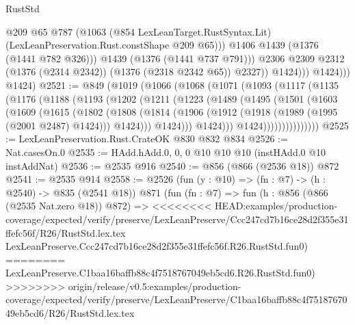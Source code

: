 \begin{lexlean}{RustStd}
\begin{coremodule}
{\begin{coremodule}
{{{{{                            @209
                            @65
                            @787
                            (@1063
                              (@854 LexLeanTarget.RustSyntax.Lit)
                              (LexLeanPreservation.Rust.constShape @209 @65)))
                          @1406
                          @1439
                          (@1376 (@1441 @782 @326)))
                        @1439
                        (@1376 (@1441 @737 @791)))
                      @2306
                      @2309
                      @2312
                      (@1376 (@2314 @2342))
                      (@1376 (@2318 @2342 @65))
                      @2327))
                  @1424)))
            @1424)))
      @1424)
@2521 := @849
    (@1019
      (@1066
        (@1068
          (@1071
            (@1093
              (@1117
                (@1135
                  (@1176
                    (@1188
                      (@1193
                        (@1202
                          (@1211
                            (@1223
                              (@1489
                                (@1495
                                  (@1501
                                    (@1603
                                      (@1609
                                        (@1615
                                          (@1802
                                            (@1808
                                              (@1814
                                                (@1906
                                                  (@1912
                                                    (@1918 (@1989 (@1995 (@2001 @2487) @1424)))
                                                    @1424)))
                                              @1424)))
                                        @1424)))
                                  @1424)))))))))))))))
@2525 := LexLeanPreservation.Rust.CrateOK @830 @832 @834
@2526 := Nat.casesOn.{0}
@2535 := HAdd.hAdd.{0, 0, 0} @10 @10 @10 (instHAdd.{0} @10 instAddNat)
@2536 := @2535 @916
@2540 := @856 (@866 (@2536 @18)) @872
@2541 := @2535 @914
@2558 := @2526
    (fun (y : @10) => (fn : @7) -> (h : @2540) -> @835 (@2541 @18))
    @871
    (fun (fn : @7) =>
    fun (h : @856 (@866 (@2535 Nat.zero @18)) @872) =>
<<<<<<<< HEAD:examples/production-coverage/expected/verify/preserve/LexLeanPreserve/Ccc247cd7b16ce28d2f355e31ffefc56f/R26/RustStd.lex.tex
    LexLeanPreserve.Ccc247cd7b16ce28d2f355e31ffefc56f.R26.RustStd.fun0)
========
    LexLeanPreserve.C1baa16baffb88c4f7518767049eb5cd6.R26.RustStd.fun0)
>>>>>>>> origin/release/v0.5:examples/production-coverage/expected/verify/preserve/LexLeanPreserve/C1baa16baffb88c4f7518767049eb5cd6/R26/RustStd.lex.tex
}}}}}
\end{coremodule}}
\end{coremodule}
\end{lexlean}
